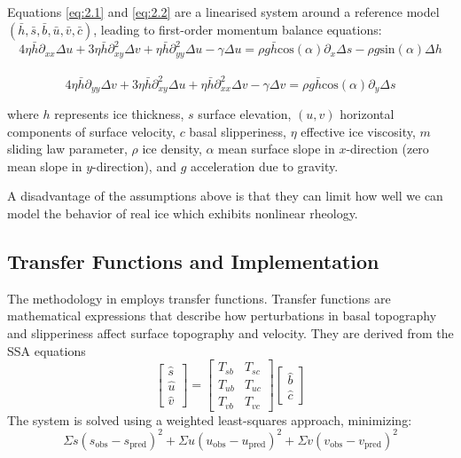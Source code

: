 Equations \ref{eq:2.1} and \ref{eq:2.2} are a linearised system around a reference model $(\bar{h}, \bar{s}, \bar{b}, \bar{u}, \bar{v}, \bar{c})$, leading to first-order momentum balance equations:
\begin{equation}
4 \eta \bar{h} \partial_{xx} \Delta u + 3 \eta \bar{h} \partial_{xy}^{2} \Delta v + \eta \bar{h} \partial_{yy}^{2}\Delta u -\gamma \Delta u  = \rho g \bar{h}\mathrm{cos}(\alpha) \partial_x \Delta s - \rho g \mathrm{sin}(\alpha)\Delta h
\end{equation}\\
\begin{equation}
4 \eta \bar{h} \partial_{yy} \Delta v + 3 \eta \bar{h} \partial_{xy}^{2} \Delta u + \eta \bar{h} \partial_{xx}^{2}\Delta v -\gamma \Delta v  = \rho g \bar{h}\mathrm{cos}(\alpha) \partial_y \Delta s
\end{equation}

where $h$ represents ice thickness, $s$ surface elevation, $(u, v)$ horizontal components of surface velocity, $c$ basal slipperiness, $\eta$ effective ice viscosity, $m$ sliding law parameter, $\rho$ ice density, $\alpha$ mean surface slope in $x$-direction (zero mean slope in $y$-direction), and $g$ acceleration due to gravity.

A disadvantage of the  assumptions above is that they can limit how well we can model the behavior of real ice which exhibits nonlinear rheology.

\subsection*{Transfer Functions and Implementation}

The methodology in \cite{Ockenden_2022} employs transfer functions. Transfer functions are mathematical expressions that describe how perturbations in basal topography and slipperiness affect surface topography and velocity. They are derived from the SSA equations
$$\begin{bmatrix}
\hat{s} \\
\hat{u} \\
\hat{v}
\end{bmatrix} =\begin{bmatrix}
T_{sb} & T_{sc} \\
T_{ub} & T_{uc} \\
T_{vb} & T_{vc}
\end{bmatrix}
\begin{bmatrix}
\hat{b}\\
\hat{c}
\end{bmatrix}$$
The system is solved using a weighted least-squares approach, minimizing:
\begin{equation}
\Sigma s(s_{\mathrm{obs}} - s_{\mathrm{pred}})^2 + \Sigma u(u_{\mathrm{obs}} - u_{\mathrm{pred}})^2 + \Sigma v(v_{\mathrm{obs}} - v_{\mathrm{pred}})^2
\end{equation}

